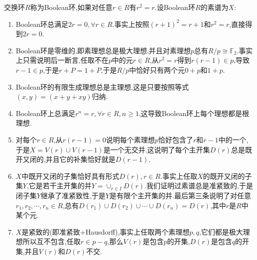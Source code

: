 \newpage


交换环$R$称为Boolean环,如果对任意$r\in R$有$r^2=r$.设Boolean环$R$的素谱为$X$:
\begin{enumerate}
	\item Boolean环总满足$2r=0,\forall r\in R$.事实上按照$(r+1)^2=r+1$和$r^2=r$,直接得到$2r=0$.
	\item Boolean环是零维的,即素理想总是极大理想,并且对素理想$p$总有$R/p\cong\mathbb{F}_2$.事实上只需说明后一断言,任取不在$p$中的元$r\in R$,从$r^2=r$得到$r(r-1)\in p$,导致$r-1\in p$,于是$r+P=1+P$,于是$R/p$中恰好只有两个元$0+p$和$1+p$.
	\item Boolean环的有限生成理想总是主理想,这是只要按照等式$(x,y)=(x+y+xy)$归纳.
	\item Boolean环上总满足$r^n=r,\forall r\in R,n\ge1$,这导致Boolean环上每个理想都是根理想.
	\item 对每个$r\in R$,从$r(r-1)=0$说明每个素理想$p$恰好包含了$r$和$r-1$中的一个,于是$X=V(r)\cup V(r-1)$是一个无交并.这说明了每个主开集$D(r)$总是既开又闭的,并且它的补集恰好就是$D(r-1)$.
	\item $X$中既开又闭的子集恰好具有形式$D(r),r\in R$.事实上任取$X$的既开又闭的子集$Y$,它是若干主开集的并$Y=\cup_{r\in I}D(r)$.我们证明过素谱总是准紧致的,于是闭子集$Y$继承了准紧致性,于是$Y$是有限个主开集的并.最后第三条说明了对任意$r_1,r_2,\cdots,r_n\in R$,总有$D(r_1)\cup D(r_2)\cup\cdots\cup D(r_n)=D(r)$,其中$r$是$R$中某个元.
	\item $X$是紧致的(即准紧致+Hausdorff),事实上任取两个素理想$p,q$,它们都是极大理想所以互不包含,任取$r\in p-q$,那么$V(r)$是包含$p$的开集,$D(r)$是包含$q$的开集,并且$V(r)$和$D(r)$不交.
\end{enumerate}







